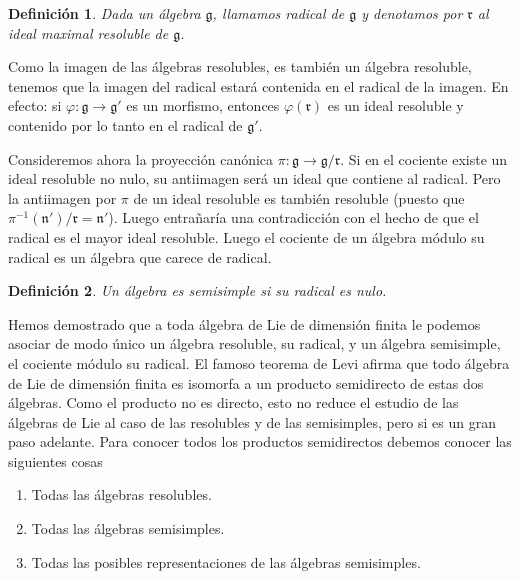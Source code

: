 \documentclass[a4paper,draft,12pt]{scrartcl}
\newtheorem{defi}{Definición}[section]%
\newcommand{\g}{\mathfrak{g}}%
\newcommand{\df}[1]{\textsf{\color{blue}#1}}
\begin{document}
\begin{defi}

Dada un álgebra $\g$, llamamos  \df{radical} de $\g$ y denotamos por $\mathfrak{r}$ al ideal maximal resoluble  de $\g$.

\end{defi}

Como la imagen de las álgebras resolubles, es también un álgebra resoluble, tenemos que la imagen del radical estará contenida en el radical de la imagen.  En efecto: si $\varphi:\g \rightarrow \g'$ es un morfismo, entonces $\varphi(\mathfrak{r})$ es un ideal resoluble y contenido por lo tanto en el radical de $\g'$.

Consideremos ahora la proyección canónica $\pi:\g \rightarrow \g/\mathfrak{r}$.  Si en el cociente existe un ideal resoluble no nulo, su antiimagen será un ideal que contiene al radical.  Pero  la antiimagen por $\pi$ de un ideal resoluble es también resoluble (puesto que $\pi^{-1}(\mathfrak{n}')/\mathfrak{r}= \mathfrak{n}'$).  Luego entrañaría una contradicción con el hecho de que el radical es el mayor ideal resoluble. Luego el cociente de un álgebra módulo su radical es un álgebra que carece de radical.

\begin{defi}

Un álgebra es  \df{semisimple} si su radical es nulo.

\end{defi}

Hemos demostrado que a toda álgebra de Lie de dimensión finita le podemos asociar de modo único un álgebra resoluble, su radical, y un álgebra semisimple, el cociente módulo su radical.  El famoso  \df{teorema de Levi} afirma que  todo álgebra de Lie de dimensión finita es isomorfa a un producto semidirecto de estas dos álgebras.  Como el producto no es directo, esto no reduce el estudio de las álgebras de Lie al caso de las resolubles y de las semisimples, pero si es un gran paso adelante.  Para conocer todos los productos semidirectos debemos conocer las siguientes cosas

\begin{enumerate}[\indent 1.- ]

\item Todas las álgebras resolubles.

\item Todas las álgebras semisimples.

\item Todas las posibles representaciones de las álgebras semisimples.

\end{enumerate}
\end{document}
